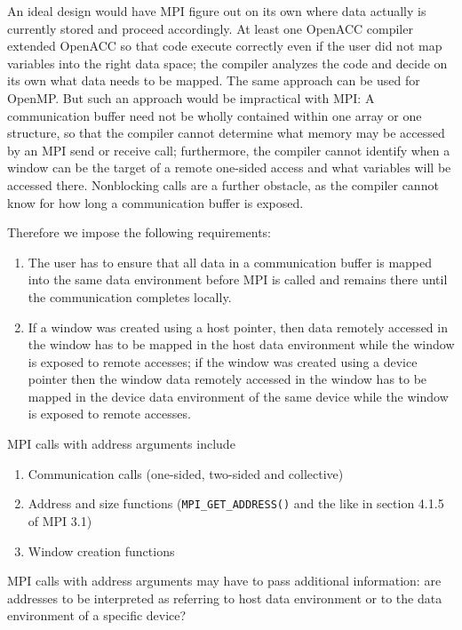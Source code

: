 \documentclass[twoside,11pt]{article}
\begin{document}
An ideal design would have MPI figure out on its own where data actually is 
currently stored and proceed accordingly. At least one OpenACC compiler 
extended OpenACC so that code execute correctly even if the user did not map 
variables into the right data space; the compiler analyzes the code and decide 
on its own what data needs to be mapped. The same approach can be used for 
OpenMP. But such an approach would be impractical with MPI: A communication 
buffer need not be wholly contained within one array or one structure, so that 
the compiler cannot determine what memory may be accessed by an MPI send or 
receive call; furthermore, the compiler cannot identify when a window can be 
the target of a remote one-sided access and what variables will be accessed 
there. Nonblocking calls are a further obstacle, as the compiler cannot know 
for how long a communication buffer is exposed.

Therefore we impose the following requirements: 
\begin{enumerate}
	\item 
	The user has to ensure that all data in a communication buffer is mapped 
	into the same data environment before MPI is called and remains there until 
	the communication completes locally.
	\item 
	If a window was created using a host pointer, then data remotely accessed 
	in the window has to be mapped in the host data environment while the 
	window is exposed to remote accesses; if the window was created using a 
	device pointer then the window data remotely accessed 
	in the window has to be mapped in the device data environment of the same 
	device while the 
	window is exposed to remote accesses.
	\end{enumerate}

MPI calls with address arguments include 
\begin{enumerate}
	\item 
	Communication calls (one-sided, 
	two-sided and collective)
	\item
	Address and size functions (\texttt{MPI\_GET\_ADDRESS()} and the like in 
	section 4.1.5 of MPI 3.1)
	\item 
	Window creation functions
\end{enumerate}

MPI calls with address arguments may have to pass additional information: are 
addresses to be interpreted as referring to host data environment or to the
data environment of a specific device?
\end{document}

